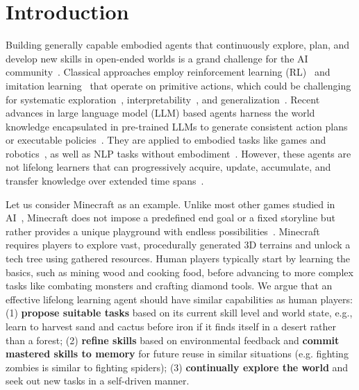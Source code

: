 \section{Introduction}
\label{sec:intro}
Building generally capable embodied agents that continuously explore, plan, and develop new skills in open-ended worlds is a grand challenge for the AI community~\cite{kolve2017ai2thor, savva2019habitat, zhu2020robosuite, xia2019igibson0.5, shen2020igibson}.
Classical approaches employ reinforcement learning (RL)~\cite{kober2013reinforcement,arulkumaran2017deep} and imitation learning~\cite{openai2022vpt,team2021creating,vinyals2019alphastar} that operate on primitive actions, which could be challenging for systematic exploration~\cite{ecoffet2019goexplore, huizinga2022evolving,wang2020enhanced,kanitscheider2021multitask, dennis2020paired}, interpretability~\cite{liang2022code,sun2020program,zhao2021proto}, and generalization~\cite{jiang2022vima,shridhar2021cliport,fan2021secant}. 
Recent advances in large language model (LLM) based agents harness the world knowledge encapsulated in pre-trained LLMs to generate consistent action plans or executable policies~\cite{liang2022code,singh2022progprompt,jiang2022vima}. They are applied to embodied tasks like games and robotics~\cite{fan2022minedojo,zeng2022socratic,ahn2022saycan,huang2022inner,huang2022language}, as well as NLP tasks without embodiment~\cite{autogpt,yao2022react,shinn2023reflexion}.  
However, these agents are not lifelong learners that can progressively acquire, update, accumulate, and transfer knowledge over extended time spans~\cite{parisi2023continual,wang2023comprehensive}.

Let us consider Minecraft as an example. Unlike most other games studied in AI~\cite{mnih2013playing, openai2019dota, vinyals2019alphastar}, Minecraft does not impose a predefined end goal or a fixed storyline but rather provides a unique playground with endless possibilities~\cite{fan2022minedojo}. Minecraft requires players to explore vast, procedurally generated 3D terrains and unlock a tech tree using gathered resources. Human players typically start by learning the basics, such as mining wood and cooking food, before advancing to more complex tasks like combating monsters and crafting diamond tools.
We argue that an effective lifelong learning agent should have similar capabilities as human players: (1) \textbf{propose suitable tasks} based on its current skill level and world state, e.g., learn to harvest sand and cactus before iron if it finds itself in a desert rather than a forest; (2) \textbf{refine skills} based on environmental feedback and \textbf{commit mastered skills to memory} for future reuse in similar situations (e.g.  fighting  zombies is similar to fighting spiders); (3) \textbf{continually explore the world} and seek out new tasks in a self-driven manner.

